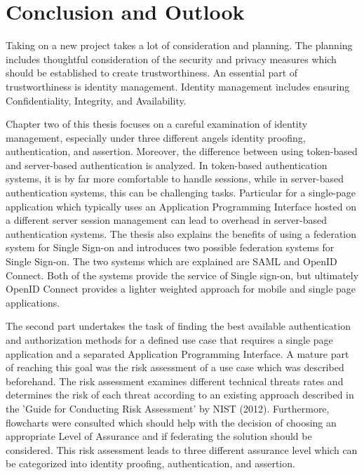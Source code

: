 \chapter{Conclusion and Outlook}\label{chap:conclusion}
\chapterstart

Taking on a new project takes a lot of consideration and planning. The planning includes thoughtful consideration of the security and privacy measures which should be established to create trustworthiness. An essential part of trustworthiness is identity management. Identity management includes ensuring Confidentiality, Integrity, and Availability. 

Chapter two of this thesis focuses on a careful examination of identity management, especially under three different angels identity proofing, authentication, and assertion. Moreover, the difference between using token-based and server-based authentication is analyzed. In token-based authentication systems, it is by far more comfortable to handle sessions, while in server-based authentication systems, this can be challenging tasks. Particular for a single-page application which typically uses an Application Programming Interface hosted on a different server session management can lead to overhead in server-based authentication systems. The thesis also explains the benefits of using a federation system for Single Sign-on and introduces two possible federation systems for Single Sign-on. The two systems which are explained are SAML and OpenID Connect. Both of the systems provide the service of Single sign-on, but ultimately OpenID Connect provides a lighter weighted approach for mobile and single page applications.

The second part undertakes the task of finding the best available authentication and authorization methods for a defined use case that requires a single page application and a separated Application Programming Interface. A mature part of reaching this goal was the risk assessment of a use case which was described beforehand. The risk assessment examines different technical threats rates and determines the risk of each threat according to an existing approach described in the 'Guide for Conducting Risk Assessment' by NIST (2012). Furthermore, flowcharts were consulted which should help with the decision of choosing an appropriate Level of Assurance and if federating the solution should be considered. This risk assessment leads to three different assurance level which can be categorized into identity proofing, authentication, and assertion. 

